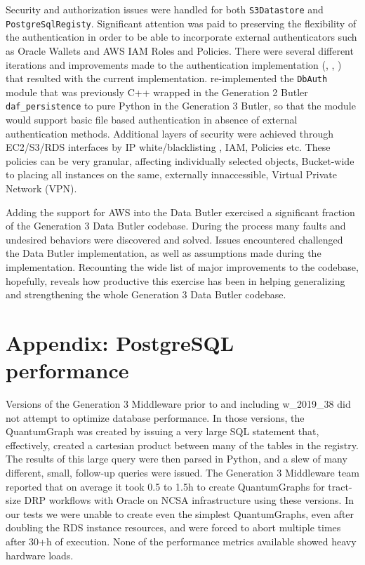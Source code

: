 Security and authorization issues were handled for both \texttt{S3Datastore} and \texttt{PostgreSqlRegisty}.
Significant attention was paid to preserving the flexibility of the authentication in order to be able to incorporate external authenticators such as Oracle Wallets and AWS IAM Roles and Policies.
There were several different iterations and improvements made to the authentication implementation (, , ) that resulted with the current implementation.
 re-implemented the \texttt{DbAuth} module that was previously C++ wrapped in the Generation 2 Butler \texttt{daf\_persistence} to pure Python in the Generation 3 Butler, so that the module would support basic file based authentication in absence of external authentication methods.
Additional layers of security were achieved through EC2/S3/RDS interfaces by IP white/blacklisting , IAM, Policies etc.
These policies can be very granular, affecting individually selected objects, Bucket-wide to placing all instances on the same, externally innaccessible, Virtual Private Network (VPN).

Adding the support for AWS into the Data Butler exercised a significant fraction of the Generation 3 Data Butler codebase.
During the process many faults and undesired behaviors were discovered and solved.
Issues encountered challenged the Data Butler implementation, as well as assumptions made during the implementation.
Recounting the wide list of major improvements to the codebase, hopefully, reveals how productive this exercise has been in helping generalizing and strengthening the whole Generation 3 Data Butler codebase.

\section{Appendix: PostgreSQL performance}

Versions of the Generation 3 Middleware prior to and including w\_2019\_38 did not attempt to optimize database performance.
In those versions, the QuantumGraph was created by issuing a very large SQL statement that, effectively, created a cartesian product between many of the tables in the registry.
The results of this large query were then parsed in Python, and a slew of many different, small, follow-up queries were issued.
The Generation 3 Middleware team reported that on average it took 0.5 to 1.5h to create QuantumGraphs for tract-size DRP workflows with Oracle on NCSA infrastructure using these versions.
In our tests we were unable to create even the simplest QuantumGraphs, even after doubling the RDS instance resources, and were forced to abort multiple times after 30+h of execution.
None of the performance metrics available showed heavy hardware loads.


